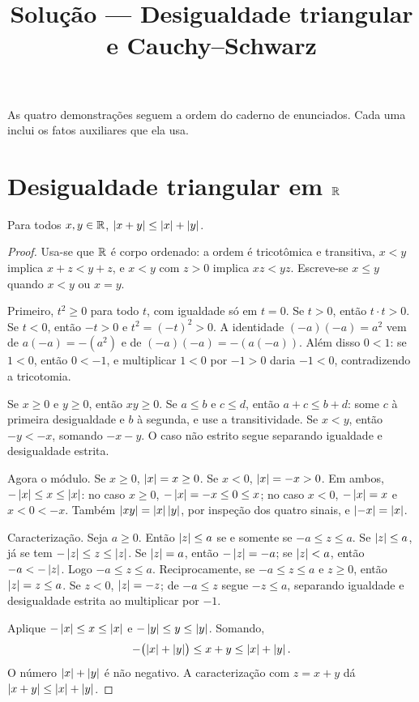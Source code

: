 \documentclass[11pt,a4paper]{article}
\title{Solução --- Desigualdade triangular e Cauchy--Schwarz}
\author{}
\date{}
\begin{document}
\maketitle
\tableofcontents

As quatro demonstrações seguem a ordem do caderno de enunciados. Cada uma inclui os fatos auxiliares que ela usa.

\section{Desigualdade triangular em \texorpdfstring{$\mathbb{R}$}{R}}

\begin{teorema}
Para todos $x,y\in\mathbb{R}$, $\left\lvert x+y \right\rvert\le\left\lvert x \right\rvert+\left\lvert y \right\rvert$.
\end{teorema}

\begin{proof}
Usa-se que $\mathbb{R}$ é corpo ordenado: a ordem é tricotômica e transitiva, $x<y$ implica $x+z<y+z$, e $x<y$ com $z>0$ implica $xz<yz$. Escreve-se $x\le y$ quando $x<y$ ou $x=y$.

Primeiro, $t^2\ge 0$ para todo $t$, com igualdade só em $t=0$. Se $t>0$, então $t\cdot t>0$. Se $t<0$, então $-t>0$ e $t^2=(-t)^2>0$. A identidade $(-a)(-a)=a^2$ vem de $a(-a)=-(a^2)$ e de $(-a)(-a)=-(a(-a))$. Além disso $0<1$: se $1<0$, então $0<-1$, e multiplicar $1<0$ por $-1>0$ daria $-1<0$, contradizendo a tricotomia.

Se $x\ge 0$ e $y\ge 0$, então $xy\ge 0$. Se $a\le b$ e $c\le d$, então $a+c\le b+d$: some $c$ à primeira desigualdade e $b$ à segunda, e use a transitividade. Se $x<y$, então $-y<-x$, somando $-x-y$. O caso não estrito segue separando igualdade e desigualdade estrita.

Agora o módulo. Se $x\ge 0$, $\left\lvert x \right\rvert=x\ge 0$. Se $x<0$, $\left\lvert x \right\rvert=-x>0$. Em ambos, $-\left\lvert x \right\rvert\le x\le\left\lvert x \right\rvert$: no caso $x\ge 0$, $-\left\lvert x \right\rvert=-x\le 0\le x$; no caso $x<0$, $-\left\lvert x \right\rvert=x$ e $x<0<-x$. Também $\left\lvert xy \right\rvert=\left\lvert x \right\rvert\left\lvert y \right\rvert$, por inspeção dos quatro sinais, e $\left\lvert -x \right\rvert=\left\lvert x \right\rvert$.

Caracterização. Seja $a\ge 0$. Então $\left\lvert z \right\rvert\le a$ se e somente se $-a\le z\le a$. Se $\left\lvert z \right\rvert\le a$, já se tem $-\left\lvert z \right\rvert\le z\le\left\lvert z \right\rvert$. Se $\left\lvert z \right\rvert=a$, então $-\left\lvert z \right\rvert=-a$; se $\left\lvert z \right\rvert<a$, então $-a<-\left\lvert z \right\rvert$. Logo $-a\le z\le a$. Reciprocamente, se $-a\le z\le a$ e $z\ge 0$, então $\left\lvert z \right\rvert=z\le a$. Se $z<0$, $\left\lvert z \right\rvert=-z$; de $-a\le z$ segue $-z\le a$, separando igualdade e desigualdade estrita ao multiplicar por $-1$.

Aplique $-\left\lvert x \right\rvert\le x\le\left\lvert x \right\rvert$ e $-\left\lvert y \right\rvert\le y\le\left\lvert y \right\rvert$. Somando,
\[
-\bigl(\left\lvert x \right\rvert+\left\lvert y \right\rvert\bigr)\le x+y\le\left\lvert x \right\rvert+\left\lvert y \right\rvert.
\]
O número $\left\lvert x \right\rvert+\left\lvert y \right\rvert$ é não negativo. A caracterização com $z=x+y$ dá $\left\lvert x+y \right\rvert\le\left\lvert x \right\rvert+\left\lvert y \right\rvert$.
\end{proof}
\end{document}
